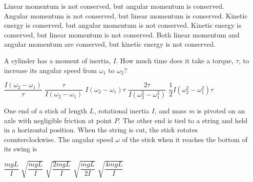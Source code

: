 \documentclass{../../../oss-ap12ibhl-print}
\begin{document}
\begin{questions}
  \begin{minipage}{.3\linewidth}
  \end{minipage}
  \begin{minipage}{.69\linewidth}
    \begin{choices}
      \choice Linear momentum is not conserved, but angular momentum is
      conserved.
      \choice Angular momentum is not conserved, but linear momentum is
      conserved.
      \choice Kinetic energy is conserved, but angular momentum is not
      conserved.
      \choice Kinetic energy is conserved, but linear momentum is not
      conserved.
      \choice Both linear momentum and angular momentum are conserved, but
      kinetic energy is not conserved.
    \end{choices}
  \end{minipage}
    
  \question A cylinder has a moment of inertia, $I$. How much time does it take
  a torque, $\tau$, to increase its angular speed from $\omega_1$ to $\omega_2$?
  \begin{choices}
    \choice $\dfrac{I(\omega_2-\omega_1)}{\tau}$
    \choice $\dfrac{\tau}{I(\omega_2-\omega_1)}$
    \choice $I(\omega_2-\omega_1)\tau$
    \choice $\dfrac{2\tau}{I(\omega_2^2-\omega_1^2)}$
    \choice $\dfrac12I(\omega_2^2-\omega_1^2)\tau$
  \end{choices}
  \newpage
  
  \question One end of a stick of length $L$, rotational inertia $I$, and mass
  $m$ is pivoted on an axle with negligible friction at point $P$. The other end
  is tied to a string and held in a horizontal position. When the string is
  cut, the stick rotates counterclockwise. The angular speed $\omega$ of the
  stick when it reaches the bottom of its swing is

  \begin{minipage}{.45\linewidth}
  \end{minipage}
  \begin{minipage}{.4\linewidth}
    \begin{choices}
    \choice$\dfrac{mgL}{I}$
    \choice$\sqrt{\dfrac{mgL}{I}}$
    \choice$\sqrt{\dfrac{2mgL}{I}}$
    \choice$\sqrt{\dfrac{mgL}{2I}}$
    \choice$\sqrt{\dfrac{4mgL}{I}}$
    \end{choices}
  \end{minipage}
    

\end{questions}
\end{document}
